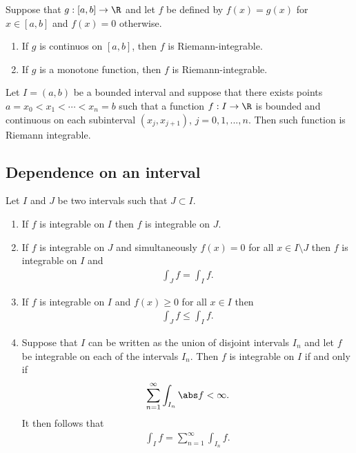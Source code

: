 \documentclass{article}
\begin{document}
\begin{theorem}[Notes 4.7]
	Suppose that $g:[a,b]\to\R$ and let $f$ be defined by $f(x)=g(x)$ for $x\in[a,b]$ and $f(x)=0$
	otherwise.
	\begin{enumerate}
		\item If $g$ is continuos on $[a,b]$, then $f$ is Riemann-integrable.
		\item If $g$ is a monotone function, then $f$ is Riemann-integrable.
	\end{enumerate}
\end{theorem}

\begin{corollary*}
	Let $I=(a,b)$ be a bounded interval and suppose that there exists points $a=x_0<x_1<\cdots<x_n=b$
	such that a function $f:I\to\R$ is bounded and continuous on each subinterval $(x_j,x_{j+1})$,
	$j=0,1,...,n$. Then such function is Riemann integrable.
\end{corollary*}

\subsection{Dependence on an interval}

\begin{theorem}[Notes 4.8]
	Let $I$ and $J$ be two intervals such that $J\subset I$.
	\begin{enumerate}
		\item If $f$ is integrable on $I$ then $f$ is integrable on $J$.
		\item If $f$ is integrable on $J$ and simultaneously $f(x)=0$ for all $x\in I\setminus J$
		      then $f$ is integrable on $I$ and \begin{align*}
			      \int_J f = \int_I f.
		      \end{align*}
		\item If $f$ is integrable on $I$ and $f(x)\geq 0$ for all $x\in I$ then \begin{align*}
			      \int_J f \leq \int_I f.
		      \end{align*}
		\item Suppose that $I$ can be written as the union of disjoint intervals $I_n$ and let $f$
		      be integrable on each of the intervals $I_n$. Then $f$ is integrable on $I$ if and only if
		      \begin{align*}
			      \sum_{n=1}^\infty \int_{I_n} \abs f < \infty.
		      \end{align*}
		      It then follows that \begin{align*}
			      \int_I f = \sum_{n=1}^\infty \int_{I_n}f.
		      \end{align*}
	\end{enumerate}
\end{theorem}
\end{document}
